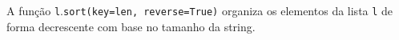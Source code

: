 \documentclass[12pt,varwidth=16cm,border=1pt]{standalone}
\begin{document}
A função \verb+l+.\verb+sort(key=len, reverse=True)+ organiza os elementos da lista \verb+l+ de forma decrescente com base no tamanho da string.

\questiomfalse
\end{document}
